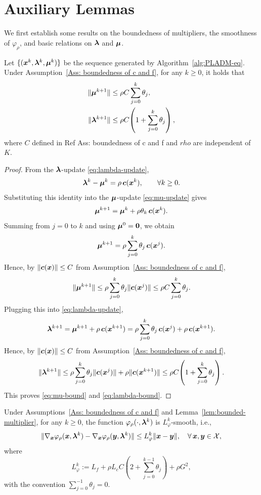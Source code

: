 \documentclass[10pt]{article}
\def\Cref#1{Ref #1}%
\begin{document}
\section{Auxiliary Lemmas}
\label{sec:analysis}
We first establish some results on the boundedness of multipliers, the smoothness of $\varphi_{\rho}$, and basic relations on $\bm{\lambda}$ and $\bm{\mu}$.
\begin{lemma}
\label{lem:bounded-multiplier}
Let $\{(\bm{x}^k, \bm{\lambda}^k, \bm{\mu}^k)\}$ be the sequence generated by 
Algorithm~\ref{alg:PLADM-eq}. Under
Assumption~\ref{Ass: boundedness of c and f}, for any $k \geq 0$, it holds that
\begin{align}
    \|\bm{\mu}^{k+1}\|
    &\leq \rho C\sum_{j=0}^{k}\theta_j,
    \label{eq:mu-bound}\\
    \|\bm{\lambda}^{k+1}\|
    &\leq \rho C\!\left(1+\sum_{j=0}^{k}\theta_j\right), 
    \label{eq:lambda-bound}
\end{align} where \(C\) defined in \Cref{Ass: boundedness of c and f} and \(rho\) are independent of $K$. 
\end{lemma}
\begin{proof}
From the $\bm{\lambda}$-update \eqref{eq:lambda-update},
\[
\bm{\lambda}^k - \bm{\mu}^k = \rho\,\bm{c}(\bm{x}^k), \qquad \forall k \geq 0.
\]
Substituting this identity into the $\bm{\mu}$-update \eqref{eq:mu-update} gives
\[
\bm{\mu}^{k+1} = \bm{\mu}^k + \rho\theta_k\,\bm{c}(\bm{x}^k).
\]
Summing from $j=0$ to $k$ and using $\bm{\mu}^0=\bm{0}$, we obtain
\[
\bm{\mu}^{k+1} = \rho\sum_{j=0}^{k}\theta_j\,\bm{c}(\bm{x}^j).
\]
Hence, by $\|\bm{c}(\bm{x})\|\leq C$ from
Assumption~\ref{Ass: boundedness of c and f},
\[
\|\bm{\mu}^{k+1}\|
\leq \rho\sum_{j=0}^{k}\theta_j\|\bm{c}(\bm{x}^j)\|
\leq \rho C\sum_{j=0}^{k}\theta_j.
\]
Plugging this into \eqref{eq:lambda-update},
\[
\bm{\lambda}^{k+1}
= \bm{\mu}^{k+1} + \rho\,\bm{c}(\bm{x}^{k+1})
= \rho\sum_{j=0}^{k}\theta_j\,\bm{c}(\bm{x}^j) + \rho\,\bm{c}(\bm{x}^{k+1}).
\]
Hence, by $\|\bm{c}(\bm{x})\|\leq C$ from
Assumption~\ref{Ass: boundedness of c and f},
\[
\|\bm{\lambda}^{k+1}\|
\leq \rho\sum_{j=0}^{k}\theta_j\|\bm{c}(\bm{x}^j)\| + \rho\|\bm{c}(\bm{x}^{k+1})\|
\leq \rho C\!\left(1+\sum_{j=0}^{k}\theta_j\right).
\]
This proves \eqref{eq:mu-bound} and \eqref{eq:lambda-bound}.
\end{proof}
\begin{lemma}
\label{lem:phi-smooth}
Under Assumptions~\ref{Ass: boundedness of c and f} and
Lemma~\ref{lem:bounded-multiplier}, for any $k \geq 0$, the function
$\varphi_{\rho}(\cdot,\bm{\lambda}^k)$ is $L_{\varphi}^k$-smooth, i.e.,
\begin{equation}\label{eq:phi-smooth}
    \|\nabla_{\bm{x}}\varphi_{\rho}(\bm{x},\bm{\lambda}^k)
     - \nabla_{\bm{x}}\varphi_{\rho}(\bm{y},\bm{\lambda}^k)\|
    \leq L_{\varphi}^k\|\bm{x}-\bm{y}\|,
    \quad \forall\,\bm{x},\bm{y}\in\mathcal{X},
\end{equation}
where
\begin{equation}\label{eq:Lphi-def}
    L_{\varphi}^k := 
    L_f + \rho L_c C\!\left(2+\sum_{j=0}^{k-1}\theta_j\right) + \rho G^2,
\end{equation}
with the convention $\sum_{j=0}^{-1}\theta_j = 0$.
\end{lemma}
\end{document}
